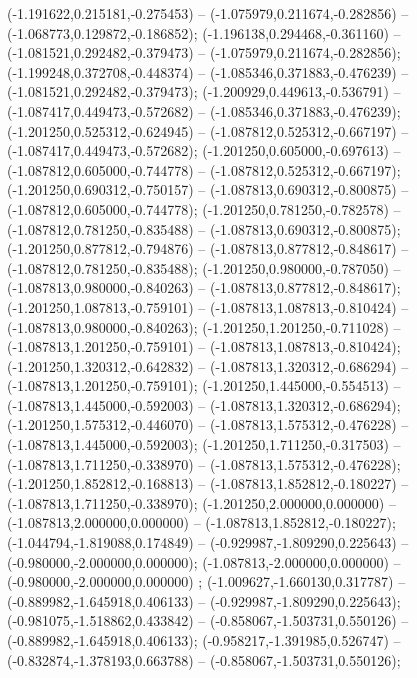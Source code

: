  (-1.191622,0.215181,-0.275453) -- (-1.075979,0.211674,-0.282856) -- (-1.068773,0.129872,-0.186852);
 (-1.196138,0.294468,-0.361160) -- (-1.081521,0.292482,-0.379473) -- (-1.075979,0.211674,-0.282856);
 (-1.199248,0.372708,-0.448374) -- (-1.085346,0.371883,-0.476239) -- (-1.081521,0.292482,-0.379473);
 (-1.200929,0.449613,-0.536791) -- (-1.087417,0.449473,-0.572682) -- (-1.085346,0.371883,-0.476239);
 (-1.201250,0.525312,-0.624945) -- (-1.087812,0.525312,-0.667197) -- (-1.087417,0.449473,-0.572682);
 (-1.201250,0.605000,-0.697613) -- (-1.087812,0.605000,-0.744778) -- (-1.087812,0.525312,-0.667197);
 (-1.201250,0.690312,-0.750157) -- (-1.087813,0.690312,-0.800875) -- (-1.087812,0.605000,-0.744778);
 (-1.201250,0.781250,-0.782578) -- (-1.087812,0.781250,-0.835488) -- (-1.087813,0.690312,-0.800875);
 (-1.201250,0.877812,-0.794876) -- (-1.087813,0.877812,-0.848617) -- (-1.087812,0.781250,-0.835488);
 (-1.201250,0.980000,-0.787050) -- (-1.087813,0.980000,-0.840263) -- (-1.087813,0.877812,-0.848617);
 (-1.201250,1.087813,-0.759101) -- (-1.087813,1.087813,-0.810424) -- (-1.087813,0.980000,-0.840263);
 (-1.201250,1.201250,-0.711028) -- (-1.087813,1.201250,-0.759101) -- (-1.087813,1.087813,-0.810424);
 (-1.201250,1.320312,-0.642832) -- (-1.087813,1.320312,-0.686294) -- (-1.087813,1.201250,-0.759101);
 (-1.201250,1.445000,-0.554513) -- (-1.087813,1.445000,-0.592003) -- (-1.087813,1.320312,-0.686294);
 (-1.201250,1.575312,-0.446070) -- (-1.087813,1.575312,-0.476228) -- (-1.087813,1.445000,-0.592003);
 (-1.201250,1.711250,-0.317503) -- (-1.087813,1.711250,-0.338970) -- (-1.087813,1.575312,-0.476228);
 (-1.201250,1.852812,-0.168813) -- (-1.087813,1.852812,-0.180227) -- (-1.087813,1.711250,-0.338970);
 (-1.201250,2.000000,0.000000) -- (-1.087813,2.000000,0.000000) -- (-1.087813,1.852812,-0.180227);
 (-1.044794,-1.819088,0.174849) -- (-0.929987,-1.809290,0.225643) -- (-0.980000,-2.000000,0.000000);
 (-1.087813,-2.000000,0.000000) -- (-0.980000,-2.000000,0.000000) ;
 (-1.009627,-1.660130,0.317787) -- (-0.889982,-1.645918,0.406133) -- (-0.929987,-1.809290,0.225643);
 (-0.981075,-1.518862,0.433842) -- (-0.858067,-1.503731,0.550126) -- (-0.889982,-1.645918,0.406133);
 (-0.958217,-1.391985,0.526747) -- (-0.832874,-1.378193,0.663788) -- (-0.858067,-1.503731,0.550126);
